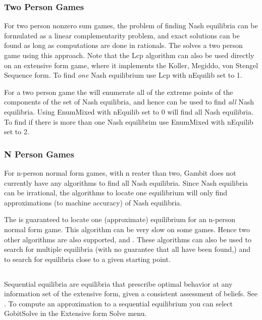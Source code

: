 \subsubsection{Two Person Games}\label{twopersec}
For two person nonzero sum 
games, the problem of finding Nash equilibria can be formulated as 
a linear complementarity problem, and exact solutions can be found as 
long as computations are done in rationals.  The 
 solves a two person 
game using this approach.  Note that the Lcp algorithm can also be used 
directly on an extensive form game, where it implements the Koller, Megiddo, 
von Stengel Sequence form.  To find {\em one} Nash equilibrium 
use Lcp with nEquilib set to 1.  

For a two person game the  
will enumerate all of the extreme points of the components of the set of 
Nash equilibria, and hence can be used to find {\em all} Nash equilibria.  Using 
EnumMixed with nEquilib set to 0 will find all Nash equilibria.  To find if 
there is more than one Nash equilibrim use EnumMixed with nEquilib set to 2.  

\subsubsection{N Person Games}\label{npernashsec}
For n-person normal form games, with n reater than two, Gambit does not 
currently have any algorithms 
to find all Nash equilibria.  Since Nash equilibria can be irrational, the algorithms to 
locate one equilibrium will only find approximations (to machine accuracy) of Nash 
equilibria. 

The 
 is guaranteed to locate one (approximate) equilibrium 
for an n-person normal form game.  This algorithm can be 
very slow on some games.  Hence two other algorithms are also supported, 
 and 
.  
These algorithms can also be used to search for multiple equilibria (with no 
guarantee that all have been found,) and to search for equilibria close to a given 
starting point. 

\subsection{}\label{seqnashsec}
Sequential equilibria are equilibria that prescribe optimal behavior at any 
information set of the extensive form, given a consistent assessment of 
beliefs.  See \cite{KrepsWilson:1982}.  To compute an approximation to a 
sequential equilibrium you can select GobitSolve in the Extensive form Solve 
menu. 

